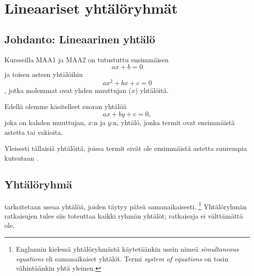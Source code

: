 \section{Lineaariset yhtälöryhmät} 


\subsection*{Johdanto: Lineaarinen yhtälö}

Kursseilla MAA1 ja MAA2 on tutustuttu ensimmäisen 
\[ax +b = 0\]
ja toisen asteen yhtälöihin
\[ax^2 + bx +c = 0\],
jotka molemmat ovat yhden muuttujan ($x$) yhtälöitä.

Edellä olemme käsitelleet suoran yhtälöä
\[ax + by + c = 0,\]
joka on kahden muuttujan, $x$:n ja $y$:n, yhtälö, jonka termit ovat ensimmäistä astetta tai vakioita.

Yleisesti tällaisiä yhtälöitä, joissa termit eivät ole ensimmäistä astetta suurempia kutsutaan .


\subsection*{Yhtälöryhmä}

 tarkoitetaan useaa yhtälöä, joiden täytyy
päteä samanaikaisesti. \footnote{Englannin kielessä yhtälöryhmästä käytetäänkin usein nimeä 
  \emph{simultaneous equations} eli samanaikaiset yhtälöt.
  Termi \emph{system of equations} on tosin vähintäänkin yhtä yleinen.}
Yhtälöryhmän ratkaisujen tulee siis toteuttaa kaikki ryhmän yhtälöt; ratkaisuja ei välttämättä ole.

